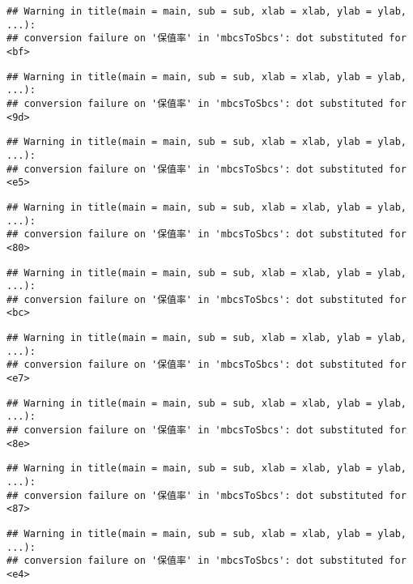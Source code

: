 \documentclass[]{article}
\begin{document}
\begin{verbatim}
## Warning in title(main = main, sub = sub, xlab = xlab, ylab = ylab, ...):
## conversion failure on '保值率' in 'mbcsToSbcs': dot substituted for <bf>
\end{verbatim}

\begin{verbatim}
## Warning in title(main = main, sub = sub, xlab = xlab, ylab = ylab, ...):
## conversion failure on '保值率' in 'mbcsToSbcs': dot substituted for <9d>
\end{verbatim}

\begin{verbatim}
## Warning in title(main = main, sub = sub, xlab = xlab, ylab = ylab, ...):
## conversion failure on '保值率' in 'mbcsToSbcs': dot substituted for <e5>
\end{verbatim}

\begin{verbatim}
## Warning in title(main = main, sub = sub, xlab = xlab, ylab = ylab, ...):
## conversion failure on '保值率' in 'mbcsToSbcs': dot substituted for <80>
\end{verbatim}

\begin{verbatim}
## Warning in title(main = main, sub = sub, xlab = xlab, ylab = ylab, ...):
## conversion failure on '保值率' in 'mbcsToSbcs': dot substituted for <bc>
\end{verbatim}

\begin{verbatim}
## Warning in title(main = main, sub = sub, xlab = xlab, ylab = ylab, ...):
## conversion failure on '保值率' in 'mbcsToSbcs': dot substituted for <e7>
\end{verbatim}

\begin{verbatim}
## Warning in title(main = main, sub = sub, xlab = xlab, ylab = ylab, ...):
## conversion failure on '保值率' in 'mbcsToSbcs': dot substituted for <8e>
\end{verbatim}

\begin{verbatim}
## Warning in title(main = main, sub = sub, xlab = xlab, ylab = ylab, ...):
## conversion failure on '保值率' in 'mbcsToSbcs': dot substituted for <87>
\end{verbatim}

\begin{verbatim}
## Warning in title(main = main, sub = sub, xlab = xlab, ylab = ylab, ...):
## conversion failure on '保值率' in 'mbcsToSbcs': dot substituted for <e4>
\end{verbatim}
\end{document}
